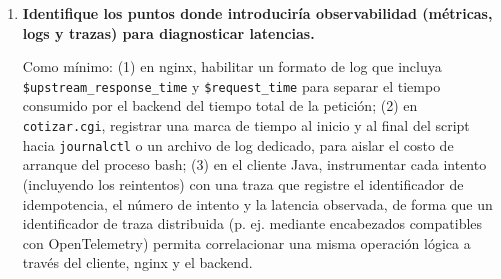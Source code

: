 \begin{enumerate}[label=\arabic*.]
En el cliente, se sustituiría \texttt{HttpClient} por un \emph{stub} generado a partir de un archivo \texttt{.proto} que describa el servicio de cotización, eliminando la construcción manual de URLs y encabezados. En nginx, se reemplazaría la configuración de \texttt{proxy\_pass}/\texttt{fastcgi\_pass} por un bloque que hable HTTP/2 de extremo a extremo hacia el backend gRPC (nginx soporta esto de forma nativa a partir de la versión 1.13.10). El script \texttt{cotizar.cgi} tendría que reescribirse como un servicio persistente en un lenguaje con soporte de gRPC (Go, Java, Python), ya que bash no cuenta con una implementación viable del protocolo; esa reescritura conserva la lógica de negocio (cálculo de la cotización) pero traslada el marshalling de JSON manual a la serialización binaria de Protocol Buffers generada automáticamente por el compilador \texttt{protoc}.

\item \textbf{Identifique los puntos donde introduciría observabilidad (métricas, logs y trazas) para diagnosticar latencias.}

Como mínimo: (1) en nginx, habilitar un formato de log que incluya \texttt{\$upstream\_response\_time} y \texttt{\$request\_time} para separar el tiempo consumido por el backend del tiempo total de la petición; (2) en \texttt{cotizar.cgi}, registrar una marca de tiempo al inicio y al final del script hacia \texttt{journalctl} o un archivo de log dedicado, para aislar el costo de arranque del proceso bash; (3) en el cliente Java, instrumentar cada intento (incluyendo los reintentos) con una traza que registre el identificador de idempotencia, el número de intento y la latencia observada, de forma que un identificador de traza distribuida (p. ej. mediante encabezados compatibles con OpenTelemetry) permita correlacionar una misma operación lógica a través del cliente, nginx y el backend.

\end{enumerate}
